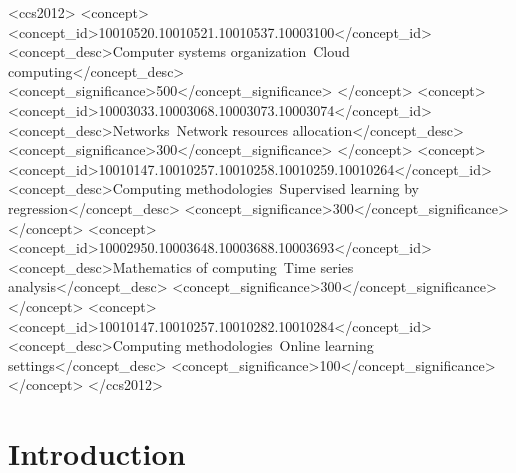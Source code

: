 \documentclass[manuscript,screen,review,anonymous]{acmart}
\begin{document}
\begin{CCSXML}
<ccs2012>
   <concept>
       <concept_id>10010520.10010521.10010537.10003100</concept_id>
       <concept_desc>Computer systems organization~Cloud computing</concept_desc>
       <concept_significance>500</concept_significance>
       </concept>
   <concept>
       <concept_id>10003033.10003068.10003073.10003074</concept_id>
       <concept_desc>Networks~Network resources allocation</concept_desc>
       <concept_significance>300</concept_significance>
       </concept>
   <concept>
       <concept_id>10010147.10010257.10010258.10010259.10010264</concept_id>
       <concept_desc>Computing methodologies~Supervised learning by regression</concept_desc>
       <concept_significance>300</concept_significance>
       </concept>
   <concept>
       <concept_id>10002950.10003648.10003688.10003693</concept_id>
       <concept_desc>Mathematics of computing~Time series analysis</concept_desc>
       <concept_significance>300</concept_significance>
       </concept>
   <concept>
       <concept_id>10010147.10010257.10010282.10010284</concept_id>
       <concept_desc>Computing methodologies~Online learning settings</concept_desc>
       <concept_significance>100</concept_significance>
       </concept>
 </ccs2012>
\end{CCSXML}



\maketitle

\section{Introduction}\label{sec:intro}
\end{document}
